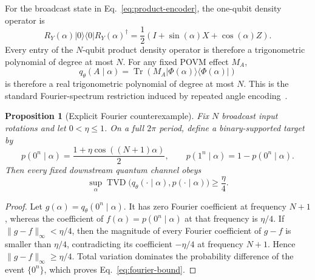 \documentclass[11pt]{article}
\newtheorem{proposition}[theorem]{Proposition}
\theoremstyle{definition}
\theoremstyle{remark}
\newcommand{\TVD}{\operatorname{TVD}}
\newcommand{\Tr}{\operatorname{Tr}}
\begin{document}
For the broadcast state in Eq.~\eqref{eq:product-encoder}, the one-qubit
density operator is
\begin{equation}
 R_Y(\alpha)|0\rangle\langle0|R_Y(\alpha)^\dagger
 =\frac12\left(I+\sin(\alpha)X+\cos(\alpha)Z\right).
 \label{eq:rotation-bloch}
\end{equation}
Every entry of the $N$-qubit product density operator is therefore a
trigonometric polynomial of degree at most $N$.  For any fixed POVM effect
$M_A$,
\begin{equation}
 q_\theta(A\mid\alpha)=
 \Tr\!\left(M_A|\Phi(\alpha)\rangle\langle\Phi(\alpha)|\right)
 \label{eq:event-linear-state}
\end{equation}
is therefore a real trigonometric polynomial of degree at most $N$.  This is
the standard Fourier-spectrum restriction induced by repeated angle
encoding~\citep{schuldEffectDataEncoding2021,casasMultidimensionalFourier2023}.

\begin{proposition}[Explicit Fourier counterexample]
\label{prop:fourier-counterexample}
Fix $N$ broadcast input rotations and let $0<\eta\leq1$.  On a full
$2\pi$ period, define a binary-supported target by
\begin{equation}
 p(0^n\mid\alpha)=\frac{1+\eta\cos((N+1)\alpha)}{2},
 \qquad
 p(1^n\mid\alpha)=1-p(0^n\mid\alpha).
 \label{eq:high-frequency-target}
\end{equation}
Then every fixed downstream quantum channel obeys
\begin{equation}
 \sup_\alpha\TVD\bigl(q_\theta(\cdot\mid\alpha),
 p(\cdot\mid\alpha)\bigr)\geq\frac{\eta}{4}.
 \label{eq:fourier-bound}
\end{equation}
\end{proposition}

\begin{proof}
Let $g(\alpha)=q_\theta(0^n\mid\alpha)$.  It has zero Fourier coefficient at
frequency $N+1$, whereas the coefficient of
$f(\alpha)=p(0^n\mid\alpha)$ at that frequency is $\eta/4$.  If
$\lVert g-f\rVert_\infty<\eta/4$, then the magnitude of every Fourier
coefficient of $g-f$ is smaller than $\eta/4$, contradicting its coefficient
$-\eta/4$ at frequency $N+1$.  Hence
$\lVert g-f\rVert_\infty\geq\eta/4$.  Total variation dominates the
probability difference of the event $\{0^n\}$, which proves
Eq.~\eqref{eq:fourier-bound}.
\end{proof}
\end{document}
